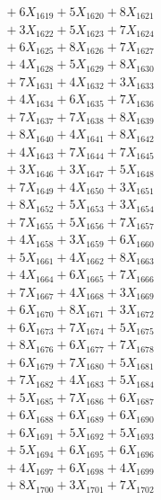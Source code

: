 \documentclass[a4paper,10pt]{article}
\begin{document}
{\begin{align}
&\;  + 6 X_{1619} + 5 X_{1620} + 8 X_{1621} \\[0.3ex]
&\;  + 3 X_{1622} + 5 X_{1623} + 7 X_{1624} \\[0.3ex]
&\;  + 6 X_{1625} + 8 X_{1626} + 7 X_{1627} \\[0.3ex]
&\;  + 4 X_{1628} + 5 X_{1629} + 8 X_{1630} \\[0.5ex]\allowbreak
&\;  + 7 X_{1631} + 4 X_{1632} + 3 X_{1633} \\[0.3ex]
&\;  + 4 X_{1634} + 6 X_{1635} + 7 X_{1636} \\[0.3ex]
&\;  + 7 X_{1637} + 7 X_{1638} + 8 X_{1639} \\[0.3ex]
&\;  + 8 X_{1640} + 4 X_{1641} + 8 X_{1642} \\[0.3ex]
&\;  + 4 X_{1643} + 7 X_{1644} + 7 X_{1645} \\[0.3ex]
&\;  + 3 X_{1646} + 3 X_{1647} + 5 X_{1648} \\[0.3ex]
&\;  + 7 X_{1649} + 4 X_{1650} + 3 X_{1651} \\[0.3ex]
&\;  + 8 X_{1652} + 5 X_{1653} + 3 X_{1654} \\[0.3ex]
&\;  + 7 X_{1655} + 5 X_{1656} + 7 X_{1657} \\[0.3ex]
&\;  + 4 X_{1658} + 3 X_{1659} + 6 X_{1660} \\[0.5ex]\allowbreak
&\;  + 5 X_{1661} + 4 X_{1662} + 8 X_{1663} \\[0.3ex]
&\;  + 4 X_{1664} + 6 X_{1665} + 7 X_{1666} \\[0.3ex]
&\;  + 7 X_{1667} + 4 X_{1668} + 3 X_{1669} \\[0.3ex]
&\;  + 6 X_{1670} + 8 X_{1671} + 3 X_{1672} \\[0.3ex]
&\;  + 6 X_{1673} + 7 X_{1674} + 5 X_{1675} \\[0.3ex]
&\;  + 8 X_{1676} + 6 X_{1677} + 7 X_{1678} \\[0.3ex]
&\;  + 6 X_{1679} + 7 X_{1680} + 5 X_{1681} \\[0.3ex]
&\;  + 7 X_{1682} + 4 X_{1683} + 5 X_{1684} \\[0.3ex]
&\;  + 5 X_{1685} + 7 X_{1686} + 6 X_{1687} \\[0.3ex]
&\;  + 6 X_{1688} + 6 X_{1689} + 6 X_{1690} \\[0.5ex]\allowbreak
&\;  + 6 X_{1691} + 5 X_{1692} + 5 X_{1693} \\[0.3ex]
&\;  + 5 X_{1694} + 6 X_{1695} + 6 X_{1696} \\[0.3ex]
&\;  + 4 X_{1697} + 6 X_{1698} + 4 X_{1699} \\[0.3ex]
&\;  + 8 X_{1700} + 3 X_{1701} + 7 X_{1702} \\[0.3ex]

\end{align}}
\end{document}
